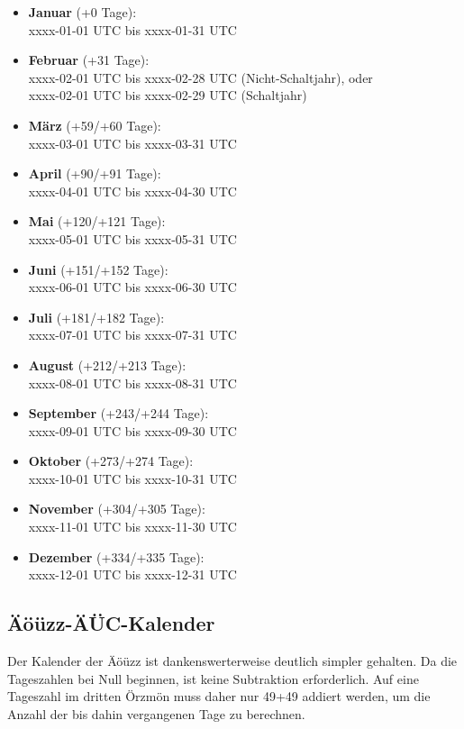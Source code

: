 \begin{itemize}
\item \textbf{Januar} (+0 Tage):\\ xxxx-01-01 UTC bis xxxx-01-31 UTC
\item \textbf{Februar} (+31 Tage):\\ xxxx-02-01 UTC bis xxxx-02-28 UTC (Nicht-Schaltjahr), oder\\ xxxx-02-01 UTC bis xxxx-02-29 UTC (Schaltjahr)
\item \textbf{März} (+59/+60 Tage):\\ xxxx-03-01 UTC bis xxxx-03-31 UTC
\item \textbf{April} (+90/+91 Tage):\\ xxxx-04-01 UTC bis xxxx-04-30 UTC
\item \textbf{Mai} (+120/+121 Tage):\\ xxxx-05-01 UTC bis xxxx-05-31 UTC
\item \textbf{Juni} (+151/+152 Tage):\\ xxxx-06-01 UTC bis xxxx-06-30 UTC
\item \textbf{Juli} (+181/+182 Tage):\\ xxxx-07-01 UTC bis xxxx-07-31 UTC
\item \textbf{August} (+212/+213 Tage):\\ xxxx-08-01 UTC bis xxxx-08-31 UTC
\item \textbf{September} (+243/+244 Tage):\\ xxxx-09-01 UTC bis xxxx-09-30 UTC
\item \textbf{Oktober} (+273/+274 Tage):\\ xxxx-10-01 UTC bis xxxx-10-31 UTC
\item \textbf{November} (+304/+305 Tage):\\ xxxx-11-01 UTC bis xxxx-11-30 UTC
\item \textbf{Dezember} (+334/+335 Tage):\\ xxxx-12-01 UTC bis xxxx-12-31 UTC
\end{itemize}

\subsection{Äöüzz-ÄÜC-Kalender}

Der Kalender der Äöüzz ist dankenswerterweise deutlich simpler gehalten. Da die Tageszahlen bei Null beginnen, ist keine Subtraktion erforderlich. Auf eine Tageszahl im dritten Örzmön muss daher nur 49+49 addiert werden, um die Anzahl der bis dahin vergangenen Tage zu berechnen.

